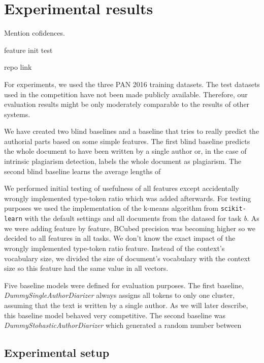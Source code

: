 \documentclass[10pt, a4paper]{article}
\begin{document}


\section{Experimental results} \label{sec:experimental-results}

Mention cofidences.

feature init test

repo link

For experiments, we used the three PAN 2016 training datasets. The test datasets used in the competition have not been made publicly available. Therefore, our evaluation results might be only moderately comparable to the results of other systems.

We have created two blind baselines and a baseline that tries to really predict the authorial parts based on some simple features. The first blind baseline predicts the whole document to have been written by a single author or, in the case of intrinsic plagiarism detection, labels the whole document as plagiarism. The second blind baseline learns the average lengths of 

We performed initial testing of usefulness of all features except accidentally wrongly implemented type-token ratio which was added afterwards. For testing purposes we used the implementation of the k-means algorithm from \texttt{scikit-learn} with the default settings and all documents from the datased for task \emph{b}. As we were adding feature by feature, BCubed precision was becoming higher so we decided to  all features in all tasks. We don't know the exact impact of the wrongly implemented type-token ratio feature. Instead of the context's vocabulary size, we divided the size of document's vocabulary with the context size so this feature had the same value in all vectors.

Five baseline models were defined for evaluation purposes. The first baseline, \textit{DummySingleAuthorDiarizer} always assigns all tokens to only one cluster, assuming that the text is written by a single author. As we will later describe, this baseline model behaved very competitive. The second baseline was \textit{DummyStohasticAuthorDiarizer} which generated a random number between 

\subsection{Experimental setup}
\end{document}
